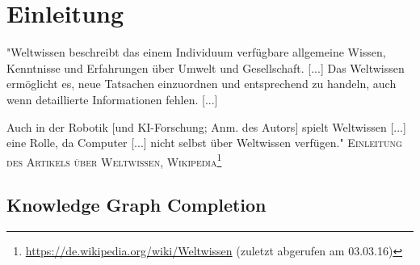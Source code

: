 
\chapter{Einleitung} %

\label{Chapter1} %


\newcommand{\keyword}[1]{\textbf{#1}}
\newcommand{\tabhead}[1]{\textbf{#1}}
\newcommand{\code}[1]{\texttt{#1}}
\newcommand{\file}[1]{\texttt{\bfseries#1}}
\newcommand{\option}[1]{\texttt{\itshape#1}}


\begin{itquote}
"Weltwissen beschreibt das einem Individuum verfügbare allgemeine Wissen, Kenntnisse und Erfahrungen über Umwelt und Gesellschaft. [...]
Das Weltwissen ermöglicht es, neue Tatsachen einzuordnen und entsprechend zu handeln, auch wenn detaillierte Informationen fehlen. [...]

Auch in der Robotik [und KI-Forschung; Anm. des Autors] spielt Weltwissen [...] eine Rolle,
da Computer [...] nicht selbst über Weltwissen verfügen."
\flushright
\textsc{Einleitung des Artikels über Weltwissen, Wikipedia\footnote{\url{https://de.wikipedia.org/wiki/Weltwissen} (zuletzt abgerufen am 03.03.16)}}
\end{itquote}

\section{Knowledge Graph Completion}

